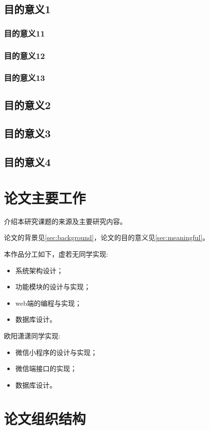 \subsection{目的意义1}
\subsubsection{目的意义11}
\subsubsection{目的意义12}
\subsubsection{目的意义13}
\subsection{目的意义2}
\subsection{目的意义3}
\subsection{目的意义4}

\section{论文主要工作}
介绍本研究课题的来源及主要研究内容。

论文的背景见\ref{sec:background}，论文的目的意义见\ref{sec:meaningful}。

本作品分工如下，虚若无同学实现:
\begin{itemize}
	\item 系统架构设计；
	\item 功能模块的设计与实现；
	\item web端的编程与实现；
	\item 数据库设计。
\end{itemize}

欧阳潇潇同学实现:
\begin{itemize}
	\item 微信小程序的设计与实现；
	\item 微信端接口的实现；
	\item 数据库设计。
\end{itemize}

\section{论文组织结构}

